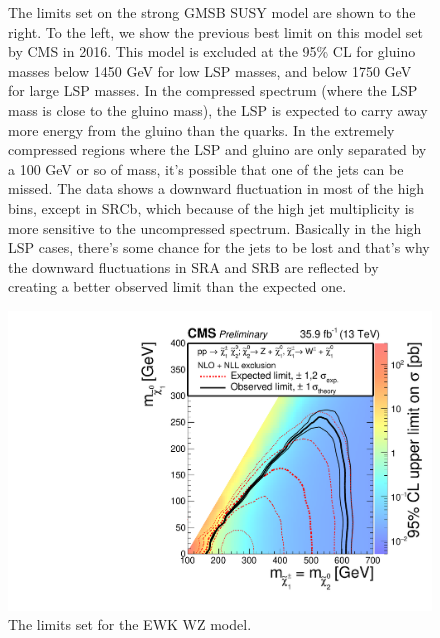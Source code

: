 \begin{figure}[!h]
{        The limits set on the strong GMSB SUSY model are shown to the right. To the left, we show the previous best limit on this model set by CMS in 2016. This model is excluded at the 95\% CL for gluino masses below 1450 GeV for low LSP masses, and below 1750 GeV for large LSP masses. In the compressed spectrum (where the LSP mass is close to the gluino mass), the LSP is expected to carry away more energy from the gluino than the quarks. In the extremely compressed regions where the LSP and gluino are only separated by a 100 GeV or so of mass, it's possible that one of the jets can be missed. The data shows a downward fluctuation in most of the high \MET bins, except in SRCb, which because of the high jet multiplicity is more sensitive to the uncompressed spectrum. Basically in the high LSP cases, there's some chance for the jets to be lost and that's why the downward fluctuations in SRA and SRB are reflected by creating a better observed limit than the expected one. 
      }
    \end{figure}

    \begin{figure}[!h]
      \centering
      \includegraphics[width=\textwidth]{figures/interpretations/TChiWZ_Exclusion_13TeV.pdf}
      \caption{ \label{fig:tchiwz_interpretation}
        The limits set for the EWK WZ model.
      }
    \end{figure}


